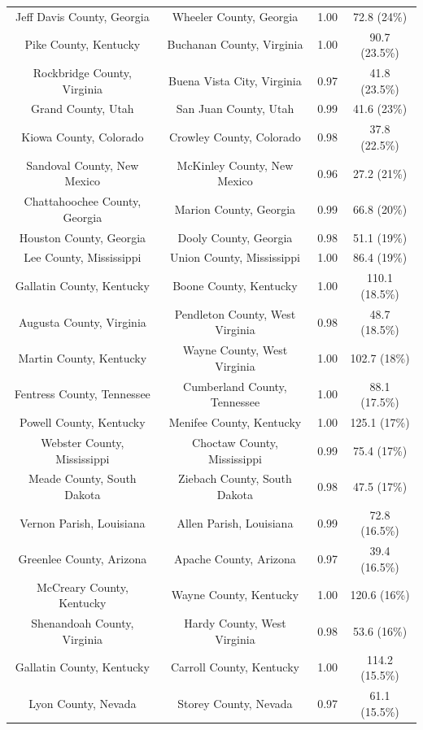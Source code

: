 \begin{longtable}{cccc}
  Jeff Davis County, Georgia & Wheeler County, Georgia & 1.00 & 72.8 (24\%) \\ 
  Pike County, Kentucky & Buchanan County, Virginia & 1.00 & 90.7 (23.5\%) \\ 
  Rockbridge County, Virginia & Buena Vista City, Virginia & 0.97 & 41.8 (23.5\%) \\ 
  Grand County, Utah & San Juan County, Utah & 0.99 & 41.6 (23\%) \\ 
  Kiowa County, Colorado & Crowley County, Colorado & 0.98 & 37.8 (22.5\%) \\ 
  Sandoval County, New Mexico & McKinley County, New Mexico & 0.96 & 27.2 (21\%) \\ 
  Chattahoochee County, Georgia & Marion County, Georgia & 0.99 & 66.8 (20\%) \\ 
  Houston County, Georgia & Dooly County, Georgia & 0.98 & 51.1 (19\%) \\ 
  Lee County, Mississippi & Union County, Mississippi & 1.00 & 86.4 (19\%) \\ 
  Gallatin County, Kentucky & Boone County, Kentucky & 1.00 & 110.1 (18.5\%) \\ 
  Augusta County, Virginia & Pendleton County, West Virginia & 0.98 & 48.7 (18.5\%) \\ 
  Martin County, Kentucky & Wayne County, West Virginia & 1.00 & 102.7 (18\%) \\ 
  Fentress County, Tennessee & Cumberland County, Tennessee & 1.00 & 88.1 (17.5\%) \\ 
  Powell County, Kentucky & Menifee County, Kentucky & 1.00 & 125.1 (17\%) \\ 
  Webster County, Mississippi & Choctaw County, Mississippi & 0.99 & 75.4 (17\%) \\ 
  Meade County, South Dakota & Ziebach County, South Dakota & 0.98 & 47.5 (17\%) \\ 
  Vernon Parish, Louisiana & Allen Parish, Louisiana & 0.99 & 72.8 (16.5\%) \\ 
  Greenlee County, Arizona & Apache County, Arizona & 0.97 & 39.4 (16.5\%) \\ 
  McCreary County, Kentucky & Wayne County, Kentucky & 1.00 & 120.6 (16\%) \\ 
  Shenandoah County, Virginia & Hardy County, West Virginia & 0.98 & 53.6 (16\%) \\ 
  Gallatin County, Kentucky & Carroll County, Kentucky & 1.00 & 114.2 (15.5\%) \\ 
  Lyon County, Nevada & Storey County, Nevada & 0.97 & 61.1 (15.5\%) \\ 

\end{longtable}
